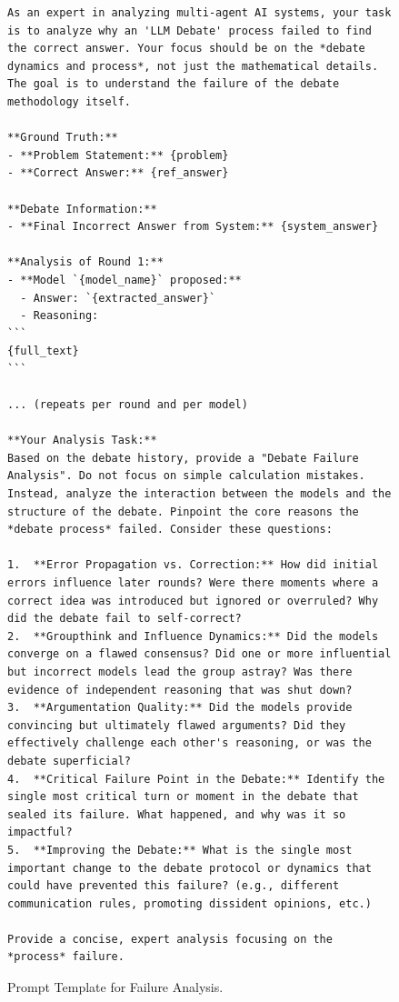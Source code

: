 

\begin{figure}[htbp]
  \begin{minipage}{\linewidth}
  \begin{lstlisting}[style=promptstyle]
As an expert in analyzing multi-agent AI systems, your task is to analyze why an 'LLM Debate' process failed to find the correct answer. Your focus should be on the *debate dynamics and process*, not just the mathematical details. The goal is to understand the failure of the debate methodology itself.

**Ground Truth:**
- **Problem Statement:** {problem}
- **Correct Answer:** {ref_answer}

**Debate Information:**
- **Final Incorrect Answer from System:** {system_answer}

**Analysis of Round 1:**
- **Model `{model_name}` proposed:**
  - Answer: `{extracted_answer}`
  - Reasoning:
```
{full_text}
```

... (repeats per round and per model)

**Your Analysis Task:**
Based on the debate history, provide a "Debate Failure Analysis". Do not focus on simple calculation mistakes. Instead, analyze the interaction between the models and the structure of the debate. Pinpoint the core reasons the *debate process* failed. Consider these questions:

1.  **Error Propagation vs. Correction:** How did initial errors influence later rounds? Were there moments where a correct idea was introduced but ignored or overruled? Why did the debate fail to self-correct?
2.  **Groupthink and Influence Dynamics:** Did the models converge on a flawed consensus? Did one or more influential but incorrect models lead the group astray? Was there evidence of independent reasoning that was shut down?
3.  **Argumentation Quality:** Did the models provide convincing but ultimately flawed arguments? Did they effectively challenge each other's reasoning, or was the debate superficial?
4.  **Critical Failure Point in the Debate:** Identify the single most critical turn or moment in the debate that sealed its failure. What happened, and why was it so impactful?
5.  **Improving the Debate:** What is the single most important change to the debate protocol or dynamics that could have prevented this failure? (e.g., different communication rules, promoting dissident opinions, etc.)

Provide a concise, expert analysis focusing on the *process* failure.
\end{lstlisting}
  \end{minipage}
  \caption{Prompt Template for Failure Analysis.}
  \label{lst:prompt-analyzer}
\end{figure}

